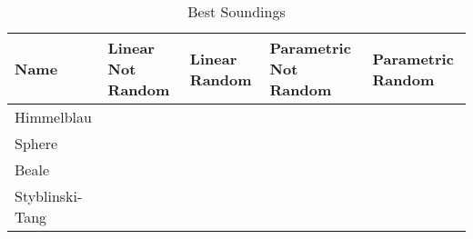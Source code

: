 \begin{sidewaystable} 
	\centering
	\label{table:BestSoundings}
	\caption{Best Soundings}
	\begin{tabular}
		{l l l l l} \hline Name & Linear Not Random & Linear Random & Parametric Not Random & Parametric Random \\
		\hline Himmelblau & \vtop{\hbox{\strut $2486.938$}\hbox{\strut $(2.67, 1.34)$}\hbox{\strut}\hbox{\strut}} &\cellcolor{blue!25} \vtop{\hbox{\strut $2498.457$}\hbox{\strut $(3.67, -1.57)$}\hbox{\strut}\hbox{\strut}} & \vtop{\hbox{\strut $2485.972$}\hbox{\strut $(-2.1, 3.30)$}\hbox{\strut}\hbox{\strut}} & \vtop{\hbox{\strut $2492.11$}\hbox{\strut $(-2.283, 3.234)$}\hbox{\strut}\hbox{\strut}} \\
		Sphere & \vtop{\hbox{\strut $3484.44$}\hbox{\strut $(-8.8, -0.67)$}\hbox{\strut}\hbox{\strut}} & \vtop{\hbox{\strut $3537.986$}\hbox{\strut $(-3.24, 3.40)$}\hbox{\strut}\hbox{\strut}} &\cellcolor{blue!25} \vtop{\hbox{\strut $3557.722$}\hbox{\strut $(-1.034, -1.099)$}\hbox{\strut}\hbox{\strut}} & \vtop{\hbox{\strut $3553.626$}\hbox{\strut $(1.69, 1.88)$}\hbox{\strut}\hbox{\strut}} \\
		Beale & \vtop{\hbox{\strut $1985.797$}\hbox{\strut $(0, 0)$}\hbox{\strut}\hbox{\strut}} & \vtop{\hbox{\strut $1472.184$}\hbox{\strut $(1.69, 2.269)$}\hbox{\strut}\hbox{\strut}} &\cellcolor{blue!25} \vtop{\hbox{\strut $1997.392$}\hbox{\strut $(-0.77, 1.559)$}\hbox{\strut}\hbox{\strut}} & \vtop{\hbox{\strut $1994.983$}\hbox{\strut $(1.309, -0.89)$}\hbox{\strut}\hbox{\strut}} \\
		Styblinski-Tang & \vtop{\hbox{\strut $5153.086$}\hbox{\strut $(-2.67, -2.67)$}\hbox{\strut}\hbox{\strut}} & \vtop{\hbox{\strut $5126.192$}\hbox{\strut $(3, -2.97)$}\hbox{\strut}\hbox{\strut}} &\cellcolor{blue!25} \vtop{\hbox{\strut $5155.97$}\hbox{\strut $(-2.77, -2.95)$}\hbox{\strut}\hbox{\strut}} & \vtop{\hbox{\strut $5154.053$}\hbox{\strut $(-3.17, -2.99)$}\hbox{\strut}\hbox{\strut}} \\
		\hline
	\end{tabular}
\end{sidewaystable}